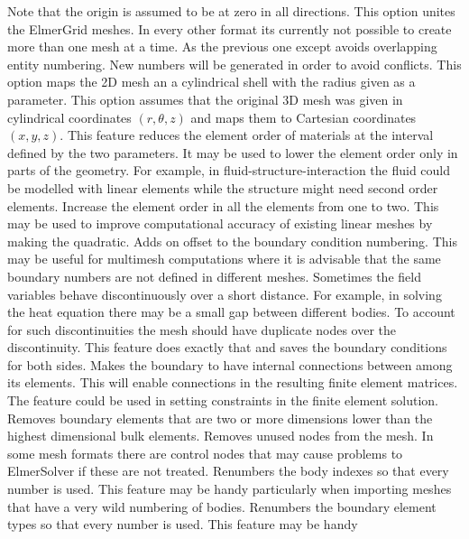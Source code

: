 Note that the origin is assumed to be at zero in all directions.
%
This option unites the ElmerGrid meshes. In every other format its currently
not possible to create more than one mesh at a time.
As the previous one except avoids overlapping entity numbering.
New numbers will be generated in order to avoid conflicts.
%
This option maps the 2D mesh an a cylindrical shell with the radius
given as a parameter.
%
This option assumes that the original 3D mesh was given in 
cylindrical coordinates $(r,\theta,z)$ and maps them to Cartesian 
coordinates $(x,y,z)$.
%
This feature reduces the element order of materials at the interval
defined by the two parameters. It may be used to lower the element order 
only in parts of the geometry. For example, in fluid-structure-interaction the 
fluid could be modelled with linear elements while the 
structure might need second order elements.
%
Increase the element order in all the elements from one to two.
This may be used to improve computational accuracy of existing 
linear meshes by making the quadratic.
%
Adds on offset to the boundary condition numbering. This may be useful for multimesh
computations where it is advisable that the same boundary numbers are not defined in 
different meshes. 
%
Sometimes the field variables behave discontinuously over a short distance.
For example, in solving the heat equation there may be a small gap between
different bodies. To account for such discontinuities the mesh should
have duplicate nodes over the discontinuity. This feature does exactly that
and saves the boundary conditions for both sides.
%
Makes the boundary to have internal connections between among its elements. This
will enable connections in the resulting finite element matrices. The feature could 
be used in setting constraints in the finite element solution. 
%
Removes boundary elements that are two or more dimensions lower than the 
highest dimensional bulk elements. 
%
Removes unused nodes from the mesh. In some mesh formats there are control nodes 
that may cause problems to ElmerSolver if these are not treated.
%
Renumbers the body indexes so that every number is used. This feature may be handy 
particularly when importing meshes that have a very wild numbering of bodies.
%
Renumbers the boundary element types so that every number is used. This feature may be handy 
